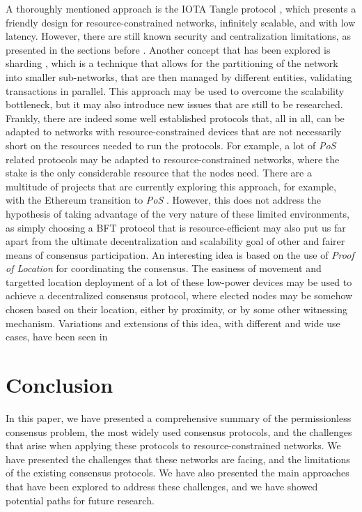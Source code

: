 \documentclass[journal]{IEEEtran}
\begin{document}
A thoroughly mentioned approach is the IOTA Tangle protocol \cite{popov2018tangle}, which
presents a friendly design for resource-constrained networks, infinitely scalable, and with low latency.
However, there are still known security and centralization limitations, as presented in the sections before \cite{8168250}.
Another concept that has been explored is sharding \cite{SALIMITARI2020100212, queralta2021blockchain}, which is a
technique that allows for the partitioning of the network into smaller sub-networks,
that are then managed by different entities, validating transactions in parallel. 
This approach may be used to overcome the scalability bottleneck,
but it may also introduce new issues that are still to be researched.
Frankly, there are indeed some well established protocols that, all in all, can be adapted to networks with
resource-constrained devices that are not necessarily short on the resources needed to run the protocols.
For example, a lot of \emph{PoS} related protocols may be adapted to resource-constrained networks, where 
the stake is the only considerable resource that the nodes need. There are a multitude of projects that are
currently exploring this approach, for example, with the Ethereum transition to \emph{PoS} \cite{buterin2017casper}.
However, this does not address the hypothesis of taking advantage of the very nature of these limited environments, 
as simply choosing a BFT protocol that is resource-efficient
may also put us far apart from the ultimate decentralization and scalability goal of 
other and fairer means of consensus participation.
An interesting idea is based on the use of \emph{Proof of Location} for 
coordinating the consensus. The easiness of movement and targetted location deployment
of a lot of these low-power devices may be used to achieve a decentralized consensus
protocol, where elected nodes may be somehow chosen based on their location, 
either by proximity, or by some other witnessing mechanism. Variations and 
extensions of this idea, with different and wide use cases, have been seen in
\cite{foam2018location, xyo2018location}

\section{Conclusion}

In this paper, we have presented a comprehensive summary of the permissionless
consensus problem, the most widely used consensus protocols, and the challenges
that arise when applying these protocols to resource-constrained networks.
We have presented the challenges that these networks are facing, and the 
limitations of the existing consensus protocols.
We have also presented the main approaches that have been explored to address these challenges,
and we have showed potential paths for future research.
\end{document}
